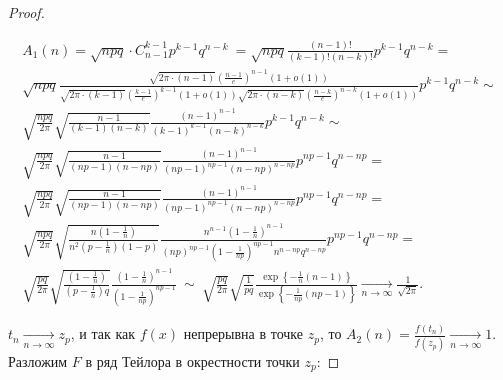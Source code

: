 \begin{proof}
\begin{unnecessary}
    \begin{gather*}
    A_1(n)=\sqrt{npq} \cdotp C_{n-1}^{k-1} p^{k-1} q^{n-k} \ =\sqrt{npq}\frac{( n-1) !}{( k-1) !( n-k) !} p^{k-1} q^{n-k} =\\ \sqrt{npq}\frac{\sqrt{2\pi \cdotp ( n-1)}\left(\frac{n-1}{e}\right)^{n-1}( 1+o( 1))}{\sqrt{2\pi \cdotp ( k-1)}\left(\frac{k-1}{e}\right)^{k-1}( 1+o( 1))\sqrt{2\pi \cdotp ( n-k)}\left(\frac{n-k}{e}\right)^{n-k}( 1+o( 1))} p^{k-1} q^{n-k}\sim\\ \sqrt{\frac{npq}{2\pi }}\sqrt{\frac{n-1}{( k-1)( n-k)}}\frac{( n-1)^{n-1}}{( k-1)^{k-1}( n-k)^{n-k}} p^{k-1} q^{n-k}\sim\\ \sqrt{\frac{npq}{2\pi }}\sqrt{\frac{n-1}{( np-1)( n-np)}}\frac{( n-1)^{n-1}}{( np-1)^{np-1}( n-np)^{n-np}} p^{np-1} q^{n-np} =\\ \sqrt{\frac{npq}{2\pi }}\sqrt{\frac{n-1}{( np-1)( n-np)}}\frac{( n-1)^{n-1}}{( np-1)^{np-1}( n-np)^{n-np}} p^{np-1} q^{n-np} =\\ \sqrt{\frac{npq}{2\pi }}\sqrt{\frac{n\left( 1-\frac{1}{n}\right)}{n^{2}\left( p-\frac{1}{n}\right)( 1-p)}}\frac{n^{n-1}\left( 1-\frac{1}{n}\right)^{n-1}}{( np)^{np-1}\left( 1-\frac{1}{np}\right)^{np-1} n^{n-np} q^{n-np}} p^{np-1} q^{n-np} =\\ \sqrt{\frac{pq}{2\pi }}\sqrt{\frac{\left( 1-\frac{1}{n}\right)}{\left( p-\frac{1}{n}\right) q}}\frac{\left( 1-\frac{1}{n}\right)^{n-1}}{\left( 1-\frac{1}{np}\right)^{np-1}} \ \sim \ \sqrt{\frac{pq}{2\pi }}\sqrt{\frac{1}{pq}}\frac{\exp\left\{-\frac{1}{n}( n-1)\right\}}{\exp\left\{-\frac{1}{np}( np-1)\right\}}\xrightarrow[n\rightarrow \infty ]{}\frac{1}{\sqrt{2\pi }} .
    \end{gather*}
\end{unnecessary}


$\displaystyle t_{n}\xrightarrow[n\rightarrow \infty ]{} z_{p}$, и так как $\displaystyle f( x)$ непрерывна в точке $\displaystyle z_{p}$, то $\displaystyle A_2(n)= \frac{f( t_{n})}{f( z_{p})}\xrightarrow[n\rightarrow \infty ]{} 1$. Разложим $\displaystyle F$ в ряд Тейлора в окрестности точки $\displaystyle z_{p}$:



\end{proof}
